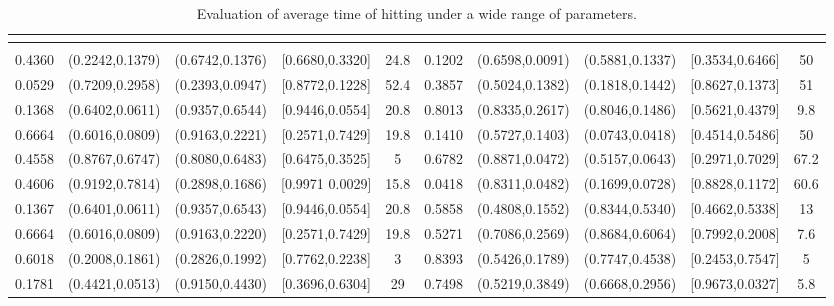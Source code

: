 \documentclass[11pt,twocolumn]{IEEEtran}
\begin{document}
\begin{table*}
\vspace{3pt}
\begin{center}
\renewcommand{\tabcolsep}{.1cm}
\renewcommand{\arraystretch}{1}
\begin{tabular}{|c|c|c|c|c||c|c|c|c|c|}
\hline
\multicolumn{5}{|c||}{} & \multicolumn{5}{|c|}{}\\
\hline
 &  &  &  &  &  &  &  &  & \\
\hline
0.4360 & (0.2242,0.1379) & (0.6742,0.1376) & [0.6680,0.3320] & 24.8 & 0.1202 & (0.6598,0.0091) & (0.5881,0.1337)  &  [0.3534,0.6466]  & 50\\
\hline
0.0529 & (0.7209,0.2958) & (0.2393,0.0947) & [0.8772,0.1228] & 52.4 & 0.3857 & (0.5024,0.1382) & (0.1818,0.1442)  &  [0.8627,0.1373]  & 51\\
\hline
0.1368 & (0.6402,0.0611) & (0.9357,0.6544) & [0.9446,0.0554] & 20.8 & 0.8013 & (0.8335,0.2617) & (0.8046,0.1486)  &  [0.5621,0.4379]  & 9.8\\
\hline
0.6664 & (0.6016,0.0809) & (0.9163,0.2221) & [0.2571,0.7429] & 19.8 & 0.1410 & (0.5727,0.1403) & (0.0743,0.0418)  &  [0.4514,0.5486]  & 50\\
\hline
0.4558 & (0.8767,0.6747) & (0.8080,0.6483) & [0.6475,0.3525] & 5 & 0.6782 & (0.8871,0.0472) & (0.5157,0.0643) &  [0.2971,0.7029]  & 67.2\\
\hline
0.4606 & (0.9192,0.7814) & (0.2898,0.1686) & [0.9971	0.0029] & 15.8 & 0.0418 & (0.8311,0.0482) & (0.1699,0.0728)  &  [0.8828,0.1172]  & 60.6\\
\hline
0.1367 & (0.6401,0.0611) & (0.9357,0.6543) & [0.9446,0.0554] & 20.8 & 0.5858 & (0.4808,0.1552) & (0.8344,0.5340)  &  [0.4662,0.5338]  & 13 \\
\hline
0.6664 & (0.6016,0.0809) & (0.9163,0.2220) & [0.2571,0.7429] & 19.8 & 0.5271 & (0.7086,0.2569) & (0.8684,0.6064)  &  [0.7992,0.2008]  & 7.6\\
\hline
0.6018 & (0.2008,0.1861) & (0.2826,0.1992) & [0.7762,0.2238] & 3 & 0.8393 & (0.5426,0.1789) & (0.7747,0.4538)  &  [0.2453,0.7547]  & 5\\
\hline
0.1781 & (0.4421,0.0513) & (0.9150,0.4430) & [0.3696,0.6304] & 29 & 0.7498 & (0.5219,0.3849) & (0.6668,0.2956)  &  [0.9673,0.0327]  & 5.8\\
\hline
\end{tabular}
\end{center}
\caption{Evaluation of average time of hitting  under a wide range of parameters.}
\label{tab:tab4}
\vspace{-10pt}
\end{table*}
\end{document}
